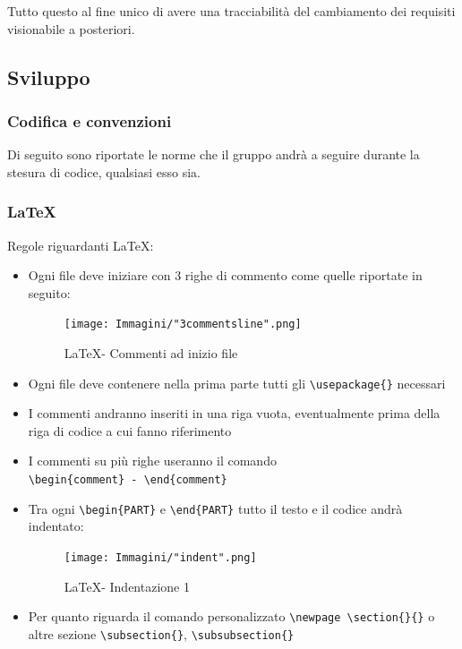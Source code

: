 \documentclass[a4paper]{article}
\begin{document}
		Tutto questo al fine unico di avere una tracciabilità del cambiamento dei requisiti visionabile a posteriori.
		\subsection{Sviluppo}
		\subsubsection{Codifica e convenzioni}
		Di seguito sono riportate le norme che il gruppo andrà a seguire durante la stesura di codice, qualsiasi esso sia.
		\subsubsection{\LaTeX}
		Regole riguardanti \LaTeX :
		\begin{itemize}
			\item Ogni file deve iniziare con 3 righe di commento come quelle riportate in seguito:
			\begin{figure}[H]
				\centering
				\texttt{[image: Immagini/"3commentsline".png]}
				\caption{\LaTeX \space - Commenti ad inizio file}
			\end{figure}
			\item Ogni file deve contenere nella prima parte tutti gli \verb|\usepackage{}| necessari
			\item I commenti andranno inseriti in una riga vuota, eventualmente prima della riga di
			codice a cui fanno riferimento
			\item I commenti su più righe useranno il comando \\ \verb|\begin{comment} - \end{comment}|
			\item Tra ogni \verb|\begin{PART}| e \verb|\end{PART}| tutto il testo e il codice andrà indentato:
			\begin{figure}[H]
				\centering
				\texttt{[image: Immagini/"indent".png]}
				\caption{\LaTeX \space - Indentazione 1}
			\end{figure}
			\item Per quanto riguarda il comando personalizzato \verb|\newpage \section{}{}| o altre sezione \verb|\subsection{}|, \verb|\subsubsection{}|

\end{itemize}
\end{document}
